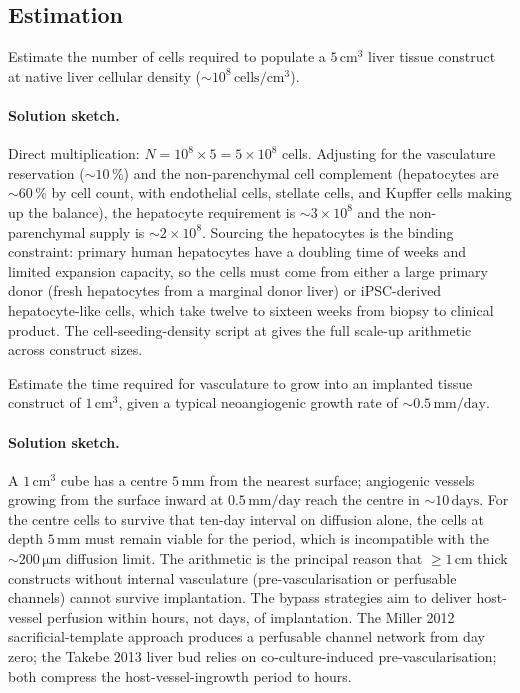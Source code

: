 \subsection*{Estimation}

\begin{exercise}
Estimate the number of cells required to populate a
$5\,\text{cm}^3$ liver tissue construct at native liver cellular
density ($\sim 10^8\,\text{cells}/\text{cm}^3$).
\end{exercise}

\paragraph{Solution sketch.} Direct multiplication:
$N = 10^8 \times 5 = 5 \times 10^8$ cells. Adjusting for the
vasculature reservation ($\sim 10\,\%$) and the non-parenchymal
cell complement (hepatocytes are $\sim 60\,\%$ by cell count, with
endothelial cells, stellate cells, and Kupffer cells making up the
balance), the hepatocyte requirement is $\sim 3 \times 10^8$ and
the non-parenchymal supply is $\sim 2 \times 10^8$. Sourcing the
hepatocytes is the binding constraint: primary human hepatocytes
have a doubling time of weeks and limited expansion capacity, so
the cells must come from either a large primary donor (fresh
hepatocytes from a marginal donor liver) or iPSC-derived
hepatocyte-like cells, which take twelve to sixteen weeks from
biopsy to clinical product. The cell-seeding-density script at
 gives the full scale-up
arithmetic across construct sizes.

\begin{exercise}
Estimate the time required for vasculature to grow into an implanted
tissue construct of $1\,\text{cm}^3$, given a typical neoangiogenic
growth rate of $\sim 0.5\,\text{mm}/\text{day}$.
\end{exercise}

\paragraph{Solution sketch.} A $1\,\text{cm}^3$ cube has a centre
$5\,\text{mm}$ from the nearest surface; angiogenic vessels growing
from the surface inward at $0.5\,\text{mm/day}$ reach the centre
in $\sim 10\,\text{days}$. For the centre cells to survive that
ten-day interval on diffusion alone, the cells at depth
$5\,\text{mm}$ must remain viable for the period, which is
incompatible with the $\sim 200\,\si{\micro\meter}$ diffusion
limit. The arithmetic is the principal reason that
$\ge 1\,\text{cm}$ thick constructs without internal vasculature
(pre-vascularisation or perfusable channels) cannot survive
implantation. The bypass strategies aim to deliver host-vessel
perfusion within hours, not days, of implantation. The Miller 2012
sacrificial-template approach \cite{paper:v6c05-miller-vascular-print-2012}
produces a perfusable channel network from day zero; the Takebe
2013 liver bud \cite{paper:v6c05-takebe-liver-2013} relies on
co-culture-induced pre-vascularisation; both compress the
host-vessel-ingrowth period to hours.

